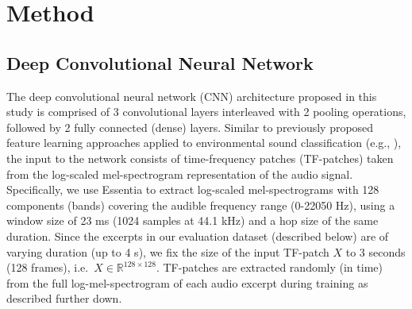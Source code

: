 \documentclass[journal,pdf]{IEEEtran}
\begin{document}
\section{Method}
\label{sec:method}

\subsection{Deep Convolutional Neural Network}

The deep convolutional neural network (CNN) architecture proposed in this study 
is comprised of 3 convolutional layers interleaved with 2 pooling operations, followed by 2 fully connected (dense) layers.
Similar to previously proposed feature learning approaches applied to environmental sound classification (e.g., \cite{Salamon:UnsupervisedUrban:ICASSP:15}), the input to the network consists of time-frequency patches (TF-patches) taken from the log-scaled mel-spectrogram representation of the audio signal. Specifically, we use Essentia \cite{bogdanov:Essentia:ISMIR13} to extract log-scaled mel-spectrograms with 128 components (bands) covering the audible frequency range (0-22050 Hz), using a window size of 23 ms (1024 samples at 44.1 kHz) and a hop size of the same duration. Since the excerpts in our evaluation dataset (described below) are of varying duration (up to 4 s), we fix the size of the input TF-patch $X$ to 3 seconds (128 frames), i.e.~$X\in\mathbb{R}^{128\times 128}$. TF-patches are extracted randomly (in time) from the full log-mel-spectrogram of each audio excerpt during training as described further down.
\end{document}
